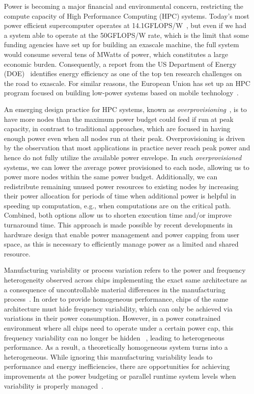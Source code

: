 
Power is becoming a major financial and environmental concern, restricting the compute 
capacity of High Performance Computing (HPC) systems. 
Today's most power efficient supercomputer operates at 14.1GFLOPS/W~\cite{Green500:2017}, 
but even if we had a system able to operate at the 50GFLOPS/W rate, which is the limit that 
some funding agencies have set up for building an exascale machine, the full system would 
consume several tens of MWatts of power, which constitutes a large economic burden. 
Consequently, a report from the US Department of Energy (DOE)~\cite{ASCAC:tech:2014} 
identifies energy efficiency as one of the top ten research challenges 
on the road to exascale. 
For similar reasons, the European Union has set up an HPC program 
focused on building low-power systems based on mobile technology~\cite{Rajovic2013}.

An emerging design practice for HPC systems, known as \textit{overprovisioning}~\cite{patki:2013:eho:2464996.2465009}, 
is to have more nodes than the maximum power budget could feed if run at peak capacity, 
in contrast to traditional approaches, which are focused in having enough power even when all 
nodes run at their peak.  Overprovisioning is driven by the observation that  most applications 
in practice never reach peak power and hence do not fully utilize the available power envelope.
In such \textit{overprovisioned} systems, we can lower the average power provisioned to each 
node, allowing us to power more nodes within the same power budget. 
Additionally, we can redistribute remaining unused power resources to existing nodes by 
increasing their power allocation for periods of time when additional power is helpful in 
speeding up computation, e.g., when computations are on the critical path. Combined, 
both options allow us to shorten execution time and/or improve turnaround time.
This approach is made possible by recent developments in hardware design that enable power 
management and power capping from user space, as this is necessary to efficiently manage 
power as a limited and shared resource.

Manufacturing variability or process variation refers to the
power and frequency heterogeneity observed across chips implementing the exact same 
architecture as a consequence of uncontrollable material differences in the manufacturing 
process~\cite{Rountree:2012:BDF:2357488.2357648}.
In order to provide homogeneous performance,  chips of the same architecture must hide 
frequency variability, which can only be achieved via variations in their power consumption.
However, in a power constrained environment where all chips need to operate under a certain 
power cap, this frequency variability can no longer be hidden
~\cite{Rountree:2012:BDF:2357488.2357648}, 
leading to heterogeneous performance.
As a result, a theoretically homogeneous system turns into a heterogeneous.  
While ignoring this manufacturing variability leads to performance and energy inefficiencies, 
there are opportunities for achieving improvements at the power budgeting or parallel runtime 
system levels when variability is properly managed~\cite{Chasapis:2016:RMM:2925426.2926279,Teodorescu:2008:VAS:1381306.1382152,Inadomi:2015:AMI:2807591.2807638,Gholkar:2016:PTH:2967938.2967961,Totoni:tech:2014}.

